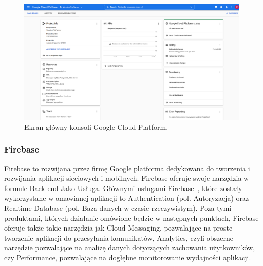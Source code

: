     \vspace{1cm}
    \begin{figure}[!ht]%
        \centering
        \includegraphics[scale=0.28]{src/gcp console.png}
        \caption{Ekran główny konsoli Google Cloud Platform.\label{gcp_console}}
        \qquad
    \end{figure} 

\newpage
        \subsubsection{Firebase}
        Firebase to rozwijana przez firmę Google platforma dedykowana do tworzenia i rozwijania aplikacji sieciowych i mobilnych. Firebase oferuje swoje narzędzia w formule
        Back-end Jako Usługa. Głównymi usługami Firebase~\cite{FIREBASE_BUILD}, które zostały wykorzystane w omawianej aplikacji to Authentication (pol. Autoryzacja) oraz Realtime 
        Database (pol. Baza danych w czasie rzeczywistym). Poza tymi produktami, których działanie omówione będzie w następnych punktach, Firebase oferuje także takie narzędzia jak 
        Cloud Messaging, pozwalające na proste tworzenie aplikacji do przesyłania komunikatów, Analytics, czyli obszerne narzędzie pozwalające na analizę danych dotyczących zachowania 
        użytkowników, czy Performance, pozwalające na dogłębne monitorowanie wydajności aplikacji. \\ 

